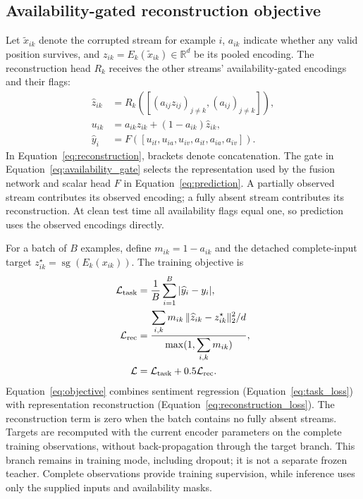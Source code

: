 \documentclass[preprint,11pt]{elsarticle}
\begin{document}
\subsection{Availability-gated reconstruction objective}

Let $\widetilde{x}_{ik}$ denote the corrupted stream for example $i$,
$a_{ik}$ indicate whether any valid position survives, and
$z_{ik}=E_k(\widetilde{x}_{ik})\in\mathbb{R}^{d}$ be its pooled encoding.
The reconstruction head $R_k$ receives the other streams' availability-gated
encodings and their flags:
\begin{align}
\widehat z_{ik} &= R_k\!\left([(a_{ij}z_{ij})_{j\ne k},(a_{ij})_{j\ne k}]\right),
\label{eq:reconstruction}\\
u_{ik} &= a_{ik}z_{ik}+(1-a_{ik})\widehat z_{ik},
\label{eq:availability_gate}\\
\widehat y_i &= F\!\left([u_{it},u_{ia},u_{iv},a_{it},a_{ia},a_{iv}]\right).
\label{eq:prediction}
\end{align}
In Equation~\eqref{eq:reconstruction}, brackets denote concatenation.
The gate in Equation~\eqref{eq:availability_gate} selects the representation
used by the fusion network and scalar head $F$ in Equation~\eqref{eq:prediction}.
A partially observed stream contributes its observed
encoding; a fully absent stream contributes its reconstruction. At clean
test time all availability flags equal one, so prediction uses the observed
encodings directly.

For a batch of $B$ examples, define $m_{ik}=1-a_{ik}$ and the detached
complete-input target $z^{\star}_{ik}=\operatorname{sg}(E_k(x_{ik}))$.
The training objective is
\begin{align}
\mathcal{L}_{\rm task} &= \frac{1}{B}\sum_{i=1}^{B}|\widehat y_i-y_i|,
\label{eq:task_loss}\\
\mathcal{L}_{\rm rec} &=
\frac{\displaystyle\sum_{i,k}m_{ik}\,
      \|\widehat z_{ik}-z^{\star}_{ik}\|_2^2/d}
     {\displaystyle\max(1,\sum_{i,k}m_{ik})},
\label{eq:reconstruction_loss}\\
\mathcal{L} &= \mathcal{L}_{\rm task}+0.5\mathcal{L}_{\rm rec}.
\label{eq:objective}
\end{align}
Equation~\eqref{eq:objective} combines sentiment regression
(Equation~\eqref{eq:task_loss}) with representation reconstruction
(Equation~\eqref{eq:reconstruction_loss}). The reconstruction term is zero
when the batch contains no fully absent
streams. Targets are recomputed with the current encoder parameters on the
complete training observations, without back-propagation through the target
branch. This branch remains in training mode, including dropout; it is not a
separate frozen teacher. Complete observations provide training supervision,
while inference uses only the supplied inputs and availability masks.
\end{document}
